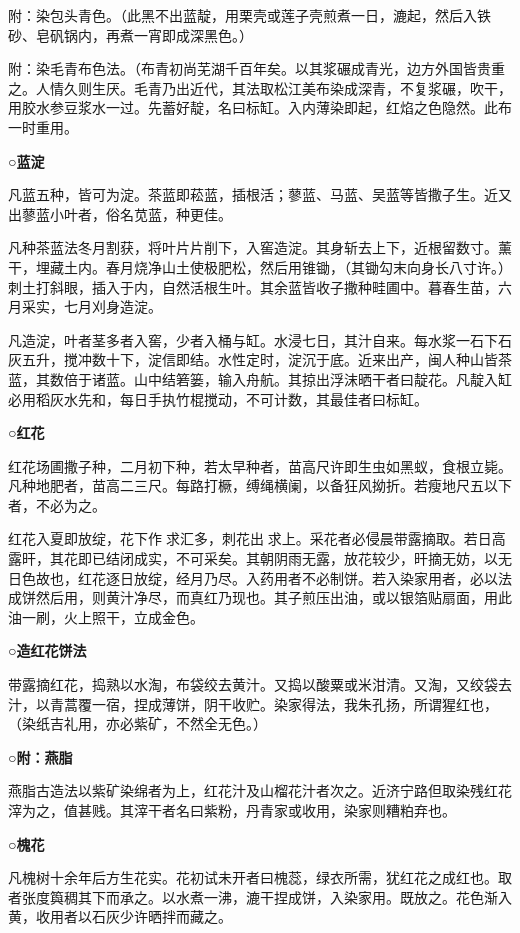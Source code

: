 \documentclass[]{article}
\begin{document}
附：染包头青色。（此黑不出蓝靛，用栗壳或莲子壳煎煮一日，漉起，然后入铁砂、皂矾锅内，再煮一宵即成深黑色。）

附：染毛青布色法。（布青初尚芜湖千百年矣。以其浆碾成青光，边方外国皆贵重之。人情久则生厌。毛青乃出近代，其法取松江美布染成深青，不复浆碾，吹干，用胶水参豆浆水一过。先蓄好靛，名曰标缸。入内薄染即起，红焰之色隐然。此布一时重用。

\textbf{○蓝淀}

凡蓝五种，皆可为淀。茶蓝即菘蓝，插根活；蓼蓝、马蓝、吴蓝等皆撒子生。近又出蓼蓝小叶者，俗名苋蓝，种更佳。

凡种茶蓝法冬月割获，将叶片片削下，入窖造淀。其身斩去上下，近根留数寸。薰干，埋藏土内。春月烧净山土使极肥松，然后用锥锄，（其锄勾末向身长八寸许。）刺土打斜眼，插入于内，自然活根生叶。其余蓝皆收子撒种畦圃中。暮春生苗，六月采实，七月刈身造淀。

凡造淀，叶者茎多者入窖，少者入桶与缸。水浸七日，其汁自来。每水浆一石下石灰五升，搅冲数十下，淀信即结。水性定时，淀沉于底。近来出产，闽人种山皆茶蓝，其数倍于诸蓝。山中结箬篓，输入舟航。其掠出浮沫晒干者曰靛花。凡靛入缸必用稻灰水先和，每日手执竹棍搅动，不可计数，其最佳者曰标缸。

\textbf{○红花}

红花场圃撒子种，二月初下种，若太早种者，苗高尺许即生虫如黑蚁，食根立毙。凡种地肥者，苗高二三尺。每路打橛，缚绳横阑，以备狂风拗折。若瘦地尺五以下者，不必为之。

红花入夏即放绽，花下作求汇多，刺花出求上。采花者必侵晨带露摘取。若日高露旰，其花即已结闭成实，不可采矣。其朝阴雨无露，放花较少，旰摘无妨，以无日色故也，红花逐日放绽，经月乃尽。入药用者不必制饼。若入染家用者，必以法成饼然后用，则黄汁净尽，而真红乃现也。其子煎压出油，或以银箔贴扇面，用此油一刷，火上照干，立成金色。

\textbf{○造红花饼法}

带露摘红花，捣熟以水淘，布袋绞去黄汁。又捣以酸粟或米泔清。又淘，又绞袋去汁，以青蒿覆一宿，捏成薄饼，阴干收贮。染家得法，我朱孔扬，所谓猩红也，（染纸吉礼用，亦必紫矿，不然全无色。）

\textbf{○附：燕脂}

燕脂古造法以紫矿染绵者为上，红花汁及山榴花汁者次之。近济宁路但取染残红花滓为之，值甚贱。其滓干者名曰紫粉，丹青家或收用，染家则糟粕弃也。

\textbf{○槐花}

凡槐树十余年后方生花实。花初试未开者曰槐蕊，绿衣所需，犹红花之成红也。取者张度籅稠其下而承之。以水煮一沸，漉干捏成饼，入染家用。既放之。花色渐入黄，收用者以石灰少许晒拌而藏之。
\end{document}
